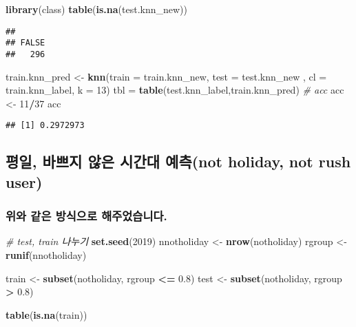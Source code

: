 \documentclass[]{article}
\newenvironment{Shaded}{\begin{snugshade}}{\end{snugshade}}
\newcommand{\KeywordTok}[1]{\textcolor[rgb]{0.13,0.29,0.53}{\textbf{#1}}}
\newcommand{\DataTypeTok}[1]{\textcolor[rgb]{0.13,0.29,0.53}{#1}}
\newcommand{\DecValTok}[1]{\textcolor[rgb]{0.00,0.00,0.81}{#1}}
\newcommand{\FloatTok}[1]{\textcolor[rgb]{0.00,0.00,0.81}{#1}}
\newcommand{\StringTok}[1]{\textcolor[rgb]{0.31,0.60,0.02}{#1}}
\newcommand{\CommentTok}[1]{\textcolor[rgb]{0.56,0.35,0.01}{\textit{#1}}}
\newcommand{\OperatorTok}[1]{\textcolor[rgb]{0.81,0.36,0.00}{\textbf{#1}}}
\newcommand{\NormalTok}[1]{#1}
\begin{document}
\begin{Shaded}
\begin{Highlighting}[]
\KeywordTok{library}\NormalTok{(class)}
\KeywordTok{table}\NormalTok{(}\KeywordTok{is.na}\NormalTok{(test.knn_new))}
\end{Highlighting}
\end{Shaded}

\begin{verbatim}
## 
## FALSE 
##   296
\end{verbatim}

\begin{Shaded}
\begin{Highlighting}[]
\NormalTok{train.knn_pred <-}\StringTok{  }\KeywordTok{knn}\NormalTok{(}\DataTypeTok{train =}\NormalTok{ train.knn_new, }\DataTypeTok{test =}\NormalTok{ test.knn_new , }\DataTypeTok{cl =}\NormalTok{ train.knn_label, }\DataTypeTok{k =} \DecValTok{13}\NormalTok{)}
\NormalTok{tbl =}\StringTok{ }\KeywordTok{table}\NormalTok{(test.knn_label,train.knn_pred)}
\CommentTok{# acc}
\NormalTok{acc <-}\StringTok{ }\DecValTok{11}\OperatorTok{/}\DecValTok{37}
\NormalTok{acc}
\end{Highlighting}
\end{Shaded}

\begin{verbatim}
## [1] 0.2972973
\end{verbatim}

\subsection{평일, 바쁘지 않은 시간대 예측(not holiday, not rush
user)}\label{----not-holiday-not-rush-user}

\subsubsection{위와 같은 방식으로 해주었습니다.}\label{---.}

\begin{Shaded}
\begin{Highlighting}[]
\CommentTok{# test, train 나누기}
\KeywordTok{set.seed}\NormalTok{(}\DecValTok{2019}\NormalTok{)}
\NormalTok{nnotholiday <-}\StringTok{ }\KeywordTok{nrow}\NormalTok{(notholiday)}
\NormalTok{rgroup <-}\StringTok{ }\KeywordTok{runif}\NormalTok{(nnotholiday)}

\NormalTok{train <-}\StringTok{ }\KeywordTok{subset}\NormalTok{(notholiday, rgroup }\OperatorTok{<=}\StringTok{ }\FloatTok{0.8}\NormalTok{)}
\NormalTok{test <-}\StringTok{ }\KeywordTok{subset}\NormalTok{(notholiday, rgroup }\OperatorTok{>}\StringTok{ }\FloatTok{0.8}\NormalTok{)}

\KeywordTok{table}\NormalTok{(}\KeywordTok{is.na}\NormalTok{(train))}
\end{Highlighting}
\end{Shaded}
\end{document}
